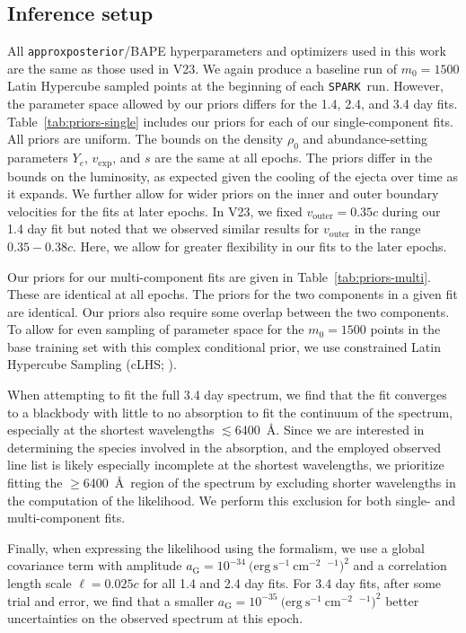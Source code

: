 \documentclass[twocolumn,twocolappendix]{aastex63}
\def\SPARK{\texttt{SPARK}}
\begin{document}
\subsection{Inference setup}\label{ssc:inference-setup}

All \texttt{approxposterior}/BAPE hyperparameters and optimizers used in this work are the same as those used in V23. We again produce a baseline run of $m_{0} = 1500$ Latin Hypercube sampled points at the beginning of each \SPARK~run. However, the parameter space allowed by our priors differs for the 1.4, 2.4, and 3.4 day fits. Table~\ref{tab:priors-single} includes our priors for each of our single-component fits. All priors are uniform. The bounds on the density $\rho_0$ and abundance-setting parameters $Y_e$, $v_{\mathrm{exp}}$, and $s$ are the same at all epochs. The priors differ in the bounds on the luminosity, as expected given the cooling of the ejecta over time as it expands. We further allow for wider priors on the inner and outer boundary velocities for the fits at later epochs. In V23, we fixed $v_{\mathrm{outer}} = 0.35c$ during our 1.4 day fit but noted that we observed similar results for $v_{\mathrm{outer}}$ in the range $0.35 - 0.38c$. Here, we allow for greater flexibility in our fits to the later epochs.
    
Our priors for our multi-component fits are given in Table~\ref{tab:priors-multi}. These are identical at all epochs. The priors for the two components in a given fit are identical. Our priors also require some overlap between the two components. To allow for even sampling of parameter space for the $m_0 = 1500$ points in the base training set with this complex conditional prior, we use constrained Latin Hypercube Sampling (cLHS; \citealt{petelet09}).
    
When attempting to fit the full 3.4 day spectrum, we find that the fit converges to a blackbody with little to no absorption to fit the continuum of the spectrum, especially at the shortest wavelengths $\lesssim$6400~\AA. Since we are interested in determining the species involved in the absorption, and the employed observed line list is likely especially incomplete at the shortest wavelengths, we prioritize fitting the $\geqslant$6400~\AA~region of the spectrum by excluding shorter wavelengths in the computation of the likelihood. We perform this exclusion for both single- and multi-component fits.

Finally, when expressing the likelihood using the \cite{czekala15} formalism, we use a global covariance term with amplitude $a_{\mathrm{G}} = 10^{-34}~(\mathrm{erg~s^{-1}~cm^{-2}}$~\text{\AA}${}^{-1})^{2}$ and a correlation length scale $\ell = 0.025c$ for all 1.4 and 2.4 day fits. For 3.4 day fits, after some trial and error, we find that a smaller $a_{\mathrm{G}} = 10^{-35}~(\mathrm{erg~s^{-1}~cm^{-2}}$~\text{\AA}${}^{-1})^{2}$ better uncertainties on the observed spectrum at this epoch.
\end{document}
